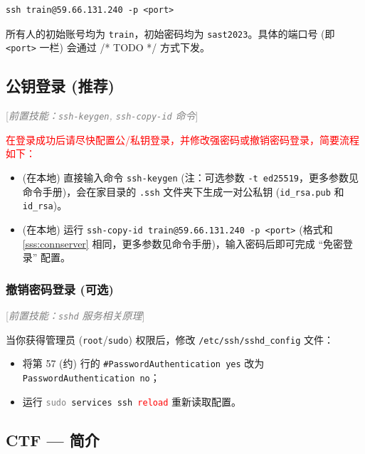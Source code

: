 \documentclass{article}
\begin{document}
	\begin{verbatim}
ssh train@59.66.131.240 -p <port>
	\end{verbatim}

	所有人的初始账号均为 \texttt{train}，初始密码均为 \texttt{sast2023}。具体的端口号 (即 \texttt{<port>} 一栏) 会通过 /* TODO */ 方式下发。

	\subsection{公钥登录 (推荐)}

	\textcolor{gray}{[\textit{前置技能：\texttt{ssh-keygen}, \texttt{ssh-copy-id} 命令}]}

	\textcolor{red}{在登录成功后请尽快配置公/私钥登录，并修改强密码或撤销密码登录，简要流程如下：}

	\begin{itemize}
		\itemsep0pt
		\item (在本地) 直接输入命令 \texttt{ssh-keygen} (注：可选参数 \texttt{-t ed25519}，更多参数见命令手册)，会在家目录的 \texttt{.ssh} 文件夹下生成一对公私钥 (\verb!id_rsa.pub! 和 \verb!id_rsa!)。
		\item (在本地) 运行 \texttt{ssh-copy-id train@59.66.131.240 -p <port>} (格式和 \ref{sss:connserver} 相同，更多参数见命令手册)，输入密码后即可完成 ``免密登录'' 配置。
	\end{itemize}

	\subsubsection{撤销密码登录 (可选)}

	\textcolor{gray}{[\textit{前置技能：\texttt{sshd} 服务相关原理}]}

	当你获得管理员 (\texttt{root}/\texttt{sudo}) 权限后，修改 \verb!/etc/ssh/sshd_config! 文件：

	\begin{itemize}
		\itemsep0pt
		\item 将第 57 (约) 行的 \verb!#PasswordAuthentication yes! 改为 \texttt{PasswordAuthentication no}；
		\item 运行 \texttt{\textcolor{gray}{sudo} services ssh \textcolor{red}{reload}} 重新读取配置。
	\end{itemize}

	\subsection{CTF --- 简介}
\end{document}
